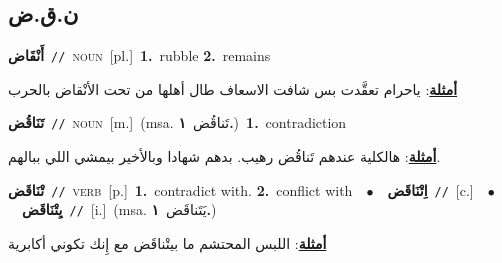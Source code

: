\documentclass[10pt,a4paper,twoside]{article} %
\begin{document}
\begin{multicols}{2}
\vspace{-3mm}
\subsection*{\color{blue}\foreignlanguage{arabic}{ن.ق.ض}\color{blue}{}} 

{\setlength\topsep{0pt}\textbf{\foreignlanguage{arabic}{أَنْقَاض}}\ {\color{gray}\texttt{//}\color{black}}\ \textsc{noun}\ [pl.]\ \textbf{1.}~rubble  \textbf{2.}~remains\  \begin{flushright}\color{gray}\foreignlanguage{arabic}{\textbf{\underline{\foreignlanguage{arabic}{أمثلة}}}: ياحرام تعقَّدت بس شافت الاسعاف طال أهلها من تحت الأنْقاض بالحرب}\end{flushright}\color{black}} \vspace{2mm}

{\setlength\topsep{0pt}\textbf{\foreignlanguage{arabic}{تَنَاقُض}}\ {\color{gray}\texttt{//}\color{black}}\ \textsc{noun}\ [m.]\ \color{gray}(msa. \foreignlanguage{arabic}{تَناقُض}~\foreignlanguage{arabic}{\textbf{١.}})\color{black}\ \textbf{1.}~contradiction\  \begin{flushright}\color{gray}\foreignlanguage{arabic}{\textbf{\underline{\foreignlanguage{arabic}{أمثلة}}}: هالكلية عندهم تَناقُض رهيب. بدهم شهادا وبالأخير بيمشي اللي ببالهم.}\end{flushright}\color{black}} \vspace{2mm}

{\setlength\topsep{0pt}\textbf{\foreignlanguage{arabic}{تْنَاقَض}}\ {\color{gray}\texttt{//}\color{black}}\ \textsc{verb}\ [p.]\ \textbf{1.}~contradict with.  \textbf{2.}~conflict with\ \ $\bullet$\ \ \setlength\topsep{0pt}\textbf{\foreignlanguage{arabic}{اِتْنَاقَض}}\ {\color{gray}\texttt{//}\color{black}}\ [c.]\ \ $\bullet$\ \ \setlength\topsep{0pt}\textbf{\foreignlanguage{arabic}{يِتْنَاقَض}}\ {\color{gray}\texttt{//}\color{black}}\ [i.]\ \color{gray}(msa. \foreignlanguage{arabic}{يَتَناقَض}~\foreignlanguage{arabic}{\textbf{١.}})\color{black}\  \begin{flushright}\color{gray}\foreignlanguage{arabic}{\textbf{\underline{\foreignlanguage{arabic}{أمثلة}}}: اللبس المحتشم ما بيتْناقَض مع إِنك تكوني أكابرية}\end{flushright}\color{black}} \vspace{2mm}


\end{multicols}
\end{document}
